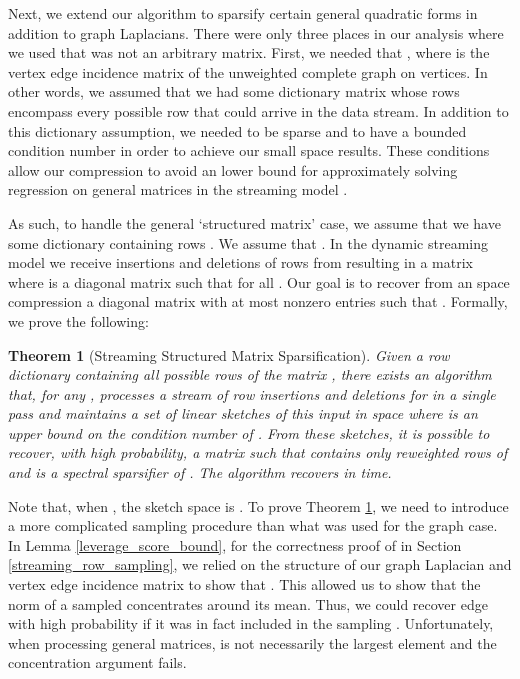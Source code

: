 \documentclass[11pt]{article}
\newtheorem{theorem}{Theorem}
\begin{document}
Next, we extend our algorithm to sparsify certain general quadratic forms in addition to graph Laplacians. There were only three places in our analysis where we used that  was not an arbitrary matrix. First, we needed that , where  is the vertex edge incidence matrix of the unweighted complete graph on  vertices. In other words, we assumed that we had some dictionary matrix  whose rows encompass every possible row that could arrive in the data stream. In addition to this dictionary assumption, we needed  to be sparse and to have a bounded condition number in order to achieve our small space results. These conditions allow our compression to avoid an  lower bound for approximately solving regression on general  matrices in the streaming model \cite{clarkson2009numerical}.

As such, to handle the general `structured matrix' case, we assume that we have some dictionary  containing  rows . We assume that . In the dynamic streaming model we receive insertions and deletions of rows from  resulting in a matrix  where  is a diagonal matrix such that  for all . Our goal is to recover from an  space compression a diagonal matrix  with at most  nonzero entries such that . Formally, we prove the following:

\begin{theorem}[Streaming Structured Matrix Sparsification] \label{main_structured_theorem}
Given a row dictionary  containing all possible rows of the matrix , there
exists an algorithm that, for any , processes a stream
of row insertions and deletions for  in a single
pass and maintains a set of linear sketches of this input in 
space where  is an upper bound on the condition number of . From these
sketches, it is possible to recover, with high probability, a matrix
 such that 
contains only  reweighted rows of 
and  is a  spectral
sparsifier of . The algorithm recovers  in  time.
\end{theorem}
Note that, when , the sketch space is .
To prove Theorem \ref{main_structured_theorem}, we need to introduce a more complicated sampling procedure than what was used for the graph case. In Lemma \ref{leverage_score_bound}, for the correctness proof of  in Section \ref{streaming_row_sampling}, we relied on the structure of our graph Laplacian and vertex edge incidence matrix to show that . This allowed us to show that the norm of a sampled  concentrates around its mean. Thus, we could recover edge  with high probability if it was in fact included in the sampling . Unfortunately, when processing general matrices,  is not necessarily the largest element  and the concentration argument fails.
\end{document}

